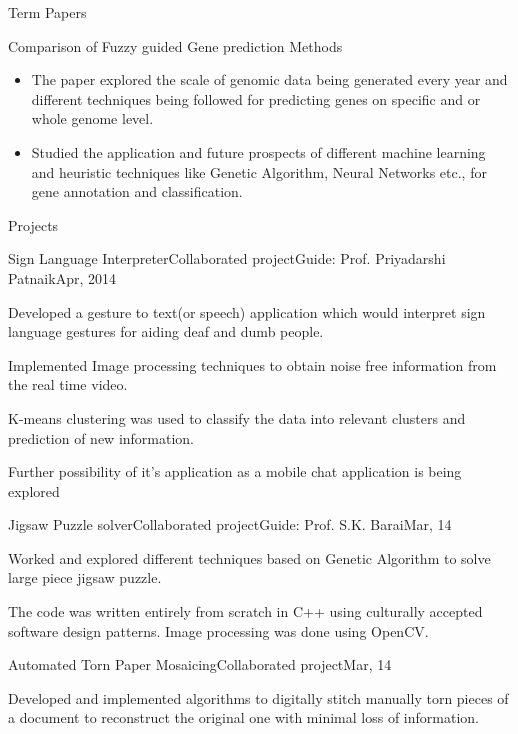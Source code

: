 \documentclass{article}
\newlength{\tabin}
\newlength{\secsep}
\newcommand{\lineunder}{\vspace*{-8pt} \\ \hspace*{-6pt} \hrulefill \\ \vspace*{-15pt}}
\newenvironment{tabbedsection}[1]{
  \begin{list}{}{
      \setlength{\itemsep}{0pt}
      \setlength{\labelsep}{0pt}
      \setlength{\labelwidth}{0pt}
      \setlength{\leftmargin}{\tabin}
      \setlength{\rightmargin}{\tabin}
      \setlength{\listparindent}{0pt}
      \setlength{\parsep}{0pt}
      \setlength{\parskip}{0pt}
      \setlength{\partopsep}{0pt}
      \setlength{\topsep}{#1}
    }
  \item[]
}{\end{list}}
\newenvironment{resume_section}[1]{
  \filbreak
  \vspace{2\secsep}
  \textsc{\large#1}
  \lineunder
  \begin{tabbedsection}{\secsep}
}{\end{tabbedsection}}
\newenvironment{resume_subsection}[2][]{
  \textbf{#2} \hfill {\footnotesize #1} \hspace{1.0em}
  \begin{tabbedsection}{0.5\secsep}
}{\end{tabbedsection}}
\newenvironment{subitems}{
  \renewcommand{\labelitemi}{-}
  \begin{itemize}
      \setlength{\labelsep}{1em}
}{\end{itemize}}
\newenvironment{resume_employer}[4]{
  \vspace{\secsep}
  \textbf{#1} \\
  \indent {\small #2} \hfill\hspace{1em}{\footnotesize#3 (#4)}
  \begin{tabbedsection}{0pt}
  \begin{subitems}
}{\end{subitems}\end{tabbedsection}}
\begin{document}
\begin{resume_section}  {Term Papers }
  \begin{resume_subsection}{Comparison of Fuzzy guided Gene prediction Methods}
    \begin{subitems}
      \item The paper explored the scale of genomic data being generated every year and different techniques being followed for predicting genes on specific and or whole genome level.
      \item Studied the application and future prospects of different machine learning and heuristic techniques like Genetic Algorithm, Neural Networks etc., for gene annotation and classification.
    \end{subitems}
    \end{resume_subsection}
\end{resume_section}

\begin{resume_section}{Projects}
  \begin{resume_employer}{Sign Language Interpreter}{Collaborated project}{Guide: Prof. Priyadarshi Patnaik}{Apr, 2014}
    \item Developed a gesture to text(or speech) application which would interpret sign language gestures for aiding deaf and dumb people.
    \item Implemented Image processing techniques to obtain noise free information from the real time video.
    \item K-means clustering was used to classify the data into relevant clusters and prediction of new information.
    \item Further possibility of it's application as a mobile chat application is being explored
  \end{resume_employer}

  \begin{resume_employer}{Jigsaw Puzzle solver}{Collaborated project}{Guide: Prof. S.K. Barai}{Mar, 14}
    \item Worked and explored different techniques based on Genetic Algorithm to solve large piece jigsaw puzzle.
    \item The code was written entirely from scratch in C++ using culturally accepted software design patterns. Image processing was done using OpenCV.
  \end{resume_employer}

  \begin{resume_employer}{Automated Torn Paper Mosaicing}{Collaborated project}{}{Mar, 14}
    \item Developed and implemented algorithms to digitally stitch manually torn pieces of a document to reconstruct the original one with minimal loss of information.
  \end{resume_employer}
\end{resume_section}
\end{document}
